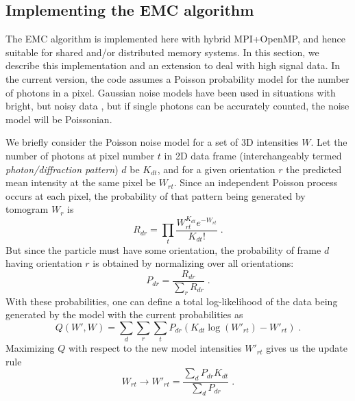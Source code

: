 \documentclass[preprint]{iucr}              %
\begin{document}
\subsection{Implementing the EMC algorithm}\label{subsec:EMC}
The EMC algorithm \cite{loh2009} is implemented here with hybrid MPI+OpenMP, and hence suitable for shared and/or distributed memory systems. In this section, we describe this implementation and an extension to deal with high signal data. In the current version, the code assumes a Poisson probability model for the number of photons in a pixel. 
Gaussian noise models have been used in situations with bright, but noisy data \cite{loh2010,ekeberg2015}, but if single photons can be accurately counted, the noise model will be Poissonian. 

We briefly consider the Poisson noise model for a set of 3D intensities $W$. Let the number of photons at pixel number $t$ in 2D data frame (interchangeably termed {\it photon/diffraction pattern}) $d$ be $K_{dt}$, and for a given orientation $r$ the predicted mean intensity at the same pixel be $W_{rt}$. Since an independent Poisson process occurs at each pixel, the probability of that pattern being generated by tomogram $W_r$ is
\begin{equation}
R_{dr} = \prod_t \frac{W_{rt}^{K_{dt}} e^{-W_{rt}}}{K_{dt}!} \;.
\label{eqn:probnumr}
\end{equation}
But since the particle must have some orientation, the probability of frame $d$ having orientation $r$ is obtained by normalizing over all orientations:
\begin{equation}
P_{dr} = \frac{R_{dr}}{\sum\limits_r R_{dr}}\;.
\label{eqn:prob}
\end{equation}
With these probabilities, one can define a total log-likelihood of the data being generated by the model with the current probabilities as
\begin{equation}
Q(W', W) = \sum_d \sum_r \sum_t P_{dr} (K_{dt} \log(W'_{rt}) - W'_{rt}) \;.
\label{eqn:totalq}
\end{equation}
Maximizing $Q$ with respect to the new model intensities $W'_{rt}$ gives us the update rule
\begin{equation}
W_{rt} \longrightarrow W'_{rt} = \frac{\sum\limits_d P_{dr} K_{dt}}{\sum\limits_d P_{dr}}\;.
\label{eqn:wupdate}
\end{equation}
\end{document}
